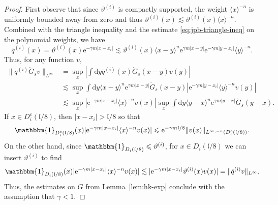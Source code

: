 \documentclass[11pt, a4paper]{scrartcl}
\numberwithin{equation}{section}
\theoremstyle{plain}
\theoremstyle{remark}
\newcommand{\mathd}{\mathrm{d}}
\newcommand{\mathe}{\mathrm{e}}
\begin{document}
\begin{proof}
  First observe that since $\vartheta^{(i)}$ is compactly supported, the weight
  $\langle x \rangle^{- n}$ is uniformly bounded away from zero and thus
  $\vartheta^{(i)} (x) \lesssim \vartheta^{(i)} (x) \langle x \rangle^{- n}$. Combined
  with the triangle inequality and the estimate \eqref{eq:jpb-triangle-ineq}
  on the polynomial weights, we have
  \begin{equation}
    \bar{q}^{(i)} (x) = \vartheta^{(i)} (x) \mathe^{- \gamma m | x - x_i |} \lesssim
    \vartheta^{(i)} (x) \langle x - y \rangle^n \mathe^{\gamma m | x - y |}
    \mathe^{- \gamma m | y - x_i |} \langle y \rangle^{- n} .
    \label{eq:rho-est}
  \end{equation}
  Thus, for any function $v$,
  \[ \begin{aligned}
       \| q^{(i)}  \dot{G}_s v \|_{L^{\infty}} &= \sup_x \left| \int \mathd
       y \bar{q}^{(i)} (x)  \dot{G}_s (x - y) v (y) \right|\\
       & \lesssim  \sup_x  \int \mathd y \langle x - y \rangle^n
       \mathe^{\gamma m | x - y |}  \dot{G}_s (x - y) | \mathe^{- \gamma m | y
       - x_i |} \langle y \rangle^{- n} v (y) |\\
       & \lesssim  \sup_x | \mathe^{- \gamma m | x - x_i |} \langle x
       \rangle^{- n} v (x) | \sup_x  \int \mathd y \langle y - x \rangle^n
       \mathe^{\gamma m | y - x |}  \dot{G}_s (y - x) .
     \end{aligned} \]
  If $x \in D_i^c (\mathfrak{l}/ 8)$, then $| x - x_i | >\mathfrak{l}/ 8$ so
  that
  \[ \mathbbm{1}_{D_i^c (\mathfrak{l}/ 8)} (x) | \mathe^{- \gamma m | x - x_i
     |} \langle x \rangle^{- n} v (x) | \leqslant \mathe^{- \gamma
     m\mathfrak{l}/ 8} \| v (x) \|_{L^{\infty, - n} (D_i^c (\mathfrak{l}/ 8))}
     . \]
  On the other hand, since $\mathbbm{1}_{D_i (\mathfrak{l}/ 8)}
  \leqslant \vartheta^{(i)}$, for $x \in D_i (\mathfrak{l}/ 8)$ we can insert
  $\vartheta^{(i)}$ to find
  \[ \mathbbm{1}_{D_i (\mathfrak{l}/ 8)} (x) | \mathe^{- \gamma m | x - x_i |}
     \langle x \rangle^{- n} v (x) | \lesssim | \mathe^{- \gamma m | x - x_i
     |} \vartheta^{(i)} (x) v (x) | = \| \bar{q}^{(i)} v \|_{L^{\infty}} . \]
  Thus, the estimates on $\dot{G}$ from Lemma~\ref{lem:hk-exp} conclude with
  the assumption that $\gamma < 1$.
\end{proof}
\end{document}
